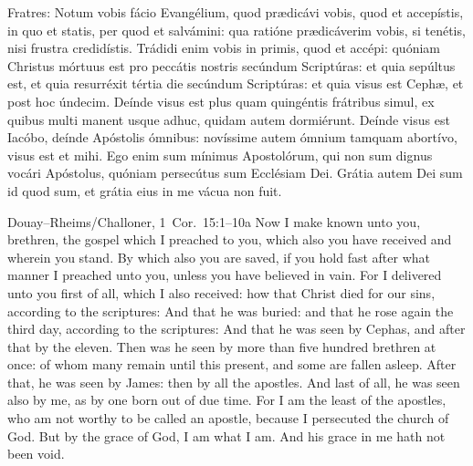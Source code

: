 Fratres: Notum vobis fácio Evangélium, quod prædicávi vobis, quod et
accepístis, in quo et statis, per quod et salvámini: qua ratióne
prædicáverim vobis, si tenétis, nisi frustra credidístis. Trádidi enim vobis
in primis, quod et accépi: quóniam Christus mórtuus est pro peccátis nostris
secúndum Scriptúras: et quia sepúltus est, et quia resurréxit tértia die
secúndum Scriptúras: et quia visus est Cephæ, et post hoc úndecim. Deínde
visus est plus quam quingéntis frátribus simul, ex quibus multi manent usque
adhuc, quidam autem dormiérunt. Deínde visus est Iacóbo, deínde Apóstolis
ómnibus: novíssime autem ómnium tamquam abortívo, visus est et mihi. Ego enim
sum mínimus Apostolórum, qui non sum dignus vocári Apóstolus, quóniam
persecútus sum Ecclésiam Dei. Grátia autem Dei sum id quod sum, et grátia
eius in me vácua non fuit.
\finishfulltextelement
\begin{fulltextenglish}{Douay--Rheims/Challoner, 1~Cor.~15:1--10a}
Now I make known unto you, brethren, the gospel which I preached to you,
which also you have received and wherein you stand. By which also you are
saved, if you hold fast after what manner I preached unto you, unless you
have believed in vain. For I delivered unto you first of all, which I also
received: how that Christ died for our sins, according to the scriptures:
And that he was buried: and that he rose again the third day, according to
the scriptures: And that he was seen by Cephas, and after that by the eleven.
Then was he seen by more than five hundred brethren at once: of whom many
remain until this present, and some are fallen asleep. After that, he was seen
by James: then by all the apostles. And last of all, he was seen also by me,
as by one born out of due time. For I am the least of the apostles, who am
not worthy to be called an apostle, because I persecuted the church of God.
But by the grace of God, I am what I am. And his grace in me hath not been
void.
\end{fulltextenglish}


